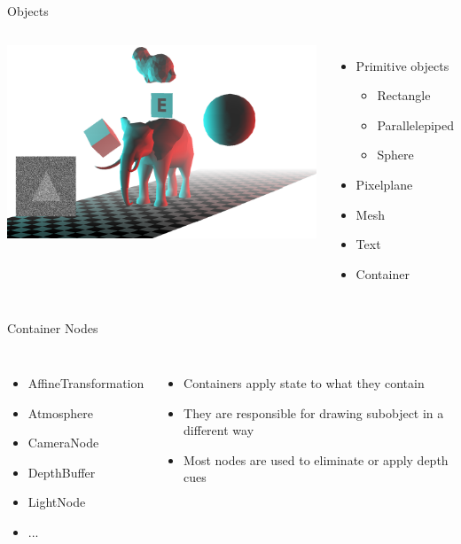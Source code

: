 \documentclass[12pt,ucs,hyperref={pdftext}]{beamer}
\newlength{\columnleft}
\newlength{\columnright}
\begin{document}
\begin{frame}{Objects}
\begin{columns}

\column{\columnleft}

\includegraphics[width=\columnleft]{media/title.png}

\column{\columnright}
\begin{itemize}%
\item Primitive objects
\begin{itemize}
\item Rectangle
\item Parallelepiped
\item Sphere
\end{itemize}
\item Pixelplane
\item Mesh
\item Text
\item Container
\end{itemize}

\end{columns}
\end{frame}

\begin{frame}{Container Nodes}
\begin{columns}

\column{\columnleft}
\begin{itemize}
\item AffineTransformation
\item Atmosphere
\item CameraNode
\item DepthBuffer
\item LightNode
\item ...
\end{itemize}

\column{\columnright}
\begin{itemize}%
\item Containers apply state to what they contain
\item They are responsible for drawing subobject in a different way
\item Most nodes are used to eliminate or apply depth cues
\end{itemize}

\end{columns}
\end{frame}
\end{document}
